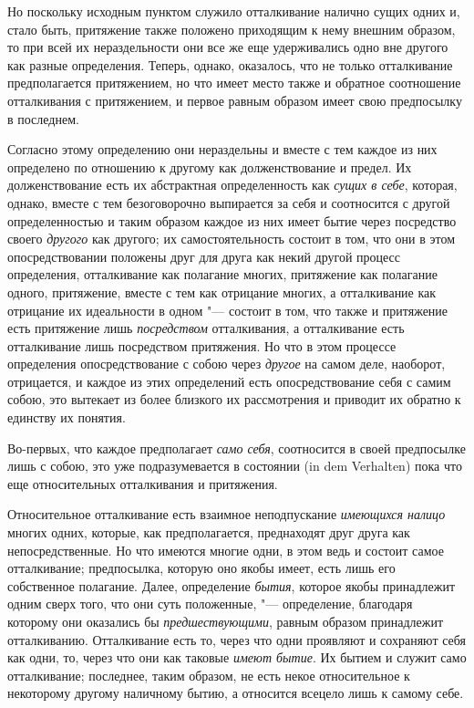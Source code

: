Но поскольку исходным пунктом служило отталкивание налично сущих одних и,
стало быть, притяжение также положено приходящим к нему внешним образом, то
при всей их нераздельности они все же еще удерживались одно вне другого как
разные определения. Теперь, однако, оказалось, что не только отталкивание
предполагается притяжением, но что имеет место также и обратное соотношение
отталкивания с притяжением, и первое равным образом имеет свою предпосылку
в последнем.

Согласно этому определению они нераздельны и вместе с тем каждое из них
определено по отношению к другому как долженствование и предел. Их
долженствование есть их абстрактная определенность как
{\em сущих в себе}, которая, однако, вместе с тем
безоговорочно выпирается за себя и соотносится с другой определенностью и
таким образом каждое из них имеет бытие через посредство своего
{\em другого} как другого; их самостоятельность состоит
в том, что они в этом опосредствовании положены друг для друга как некий
другой процесс определения, отталкивание как полагание многих, притяжение
как полагание одного, притяжение, вместе с тем как отрицание многих, а
отталкивание как отрицание их идеальности в одном "--- состоит в том, что
также и притяжение есть притяжение лишь
{\em посредством} отталкивания, а отталкивание есть
отталкивание лишь посредством притяжения. Но что в этом процессе
определения опосредствование с собою через {\em другое}
на самом деле, наоборот, отрицается, и каждое из этих определений есть
опосредствование себя с самим собою, это вытекает из более близкого их
рассмотрения и приводит их обратно к единству их понятия.

Во-первых, что каждое предполагает {\em само себя}, соотносится в своей
предпосылке лишь с собою, это уже подразумевается в состоянии
(in dem Verhalten) пока что еще относительных отталкивания и притяжения.

Относительное отталкивание есть взаимное неподпускание
{\em имеющихся налицо} многих одних, которые, как
предполагается, преднаходят друг друга как непосредственные. Но что имеются
многие одни, в этом ведь и состоит самое отталкивание; предпосылка, которую
оно якобы имеет, есть лишь его собственное полагание. Далее, определение
{\em бытия}, которое якобы принадлежит одним сверх
того, что они суть положенные, "--- определение, благодаря которому они
оказались бы {\em предшествующими}, равным образом
принадлежит отталкиванию. Отталкивание есть то, через что одни проявляют и
сохраняют себя как одни, то, через что они как таковые
{\em имеют бытие}. Их бытием и служит само
отталкивание; последнее, таким образом, не есть некое относительное к
некоторому другому наличному бытию, а относится всецело лишь к самому себе.

